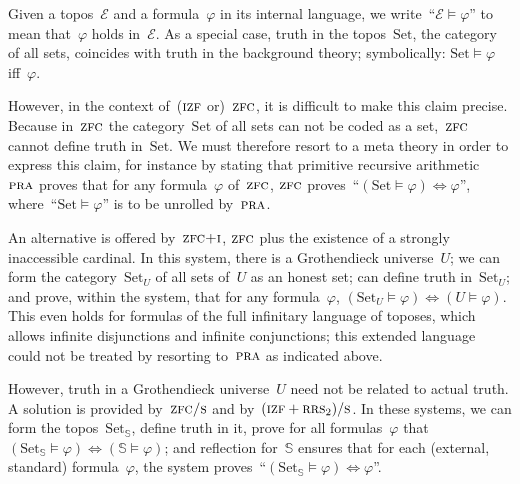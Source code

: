 \documentclass[oneside,reqno]{amsart}
\theoremstyle{definition}
\theoremstyle{plain}
\theoremstyle{remark}
\newcommand{\E}{\mathcal{E}}
\renewcommand{\SS}{\mathbb{S}}
\newcommand{\Set}{\mathrm{Set}}
\renewcommand{\_}{\mathpunct{.}\,}
\newcommand{\?}{\,{:}\,}
\newcommand{\PRA}{\textsc{pra}}
\newcommand{\IZF}{\textsc{izf}}
\newcommand{\ZFC}{\textsc{zfc}}
\newcommand{\ZFCS}{\textsc{zfc/s}}
\newcommand{\ZFCI}{\textsc{zfc+i}}
\newcommand{\RRS}{\textsc{rrs}}
\newcommand{\ES}{(\IZF+\RRS_2)/\textsc{s}}
\begin{document}
Given a topos~$\mathcal{E}$ and a formula~$\varphi$ in its internal language,
we write~``$\mathcal{E} \models \varphi$'' to mean that~$\varphi$ holds
in~$\E$. As a special case, truth in the topos~$\Set$, the category of all sets,
coincides with truth in the background theory; symbolically: $\Set \models
\varphi$ iff~$\varphi$.

However, in the context of~($\IZF$ or)~$\ZFC$, it is difficult to make this
claim precise. Because in~$\ZFC$ the category~$\Set$ of all sets can not be
coded as a set,~$\ZFC$ cannot define truth in~$\Set$. We must therefore resort
to a meta theory in order to express this claim, for instance by stating
that primitive recursive arithmetic~$\PRA$ proves that for any
formula~$\varphi$ of~$\ZFC$, $\ZFC$ proves~``$(\Set \models \varphi)
\Leftrightarrow \varphi$'', where~``$\Set \models \varphi$'' is to be unrolled
by~$\PRA$.

An alternative is offered by~$\ZFCI$, $\ZFC$ plus the existence of a
strongly inaccessible cardinal. In this system, there is a Grothendieck
universe~$U$; we can form the category~$\Set_U$ of all sets of~$U$ as an honest
set; can define truth in~$\Set_U$; and prove, within the system, that for any
formula~$\varphi$, $(\Set_U \models \varphi) \Leftrightarrow (U \models
\varphi)$. This even holds for formulas of the full infinitary language of
toposes, which allows infinite disjunctions and infinite conjunctions; this
extended language could not be treated by resorting to~$\PRA$ as indicated above.

However, truth in a Grothendieck universe~$U$ need not be related to actual
truth. A solution is provided by~$\ZFCS$ and by~$\ES$. In these systems, we can
form the topos~$\Set_\SS$, define truth in it, prove for all formulas~$\varphi$
that~$(\Set_\SS \models \varphi) \Leftrightarrow (\SS \models \varphi)$; and
reflection for~$\SS$ ensures that for each (external, standard)
formula~$\varphi$, the system proves~``$(\Set_\SS \models \varphi)
\Leftrightarrow \varphi$''.

\printbibliography
\end{document}
